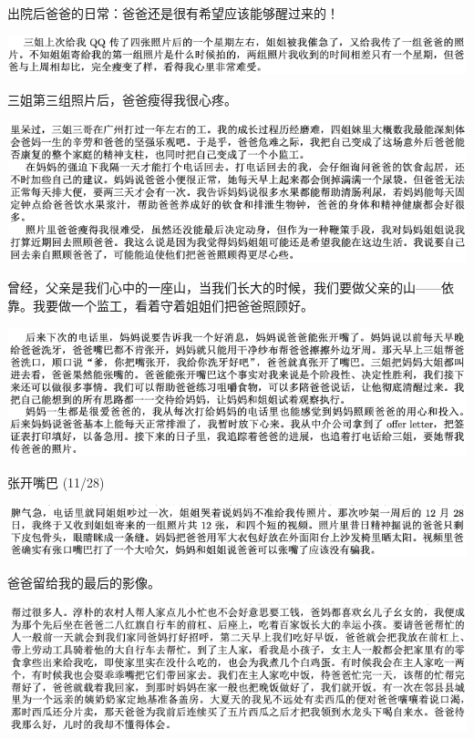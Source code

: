 \documentclass[9pt, b5paper]{article}
\begin{document}
出院后爸爸的日常：爸爸还是很有希望应该能够醒过来的！

\begin{center}
\includegraphics[width=.9\linewidth]{./pic/backups_plans_20210416_163119.png}
\end{center}

三姐第三组照片后，爸爸瘦得我很心疼。

\begin{center}
\includegraphics[width=.9\linewidth]{./pic/backups_plans_20210416_163250.png}
\end{center}

曾经，父亲是我们心中的一座山，当我们长大的时候，我们要做父亲的山——依靠。我要做一个监工，看着守着姐姐们把爸爸照顾好。

\begin{center}
\includegraphics[width=.9\linewidth]{./pic/backups_plans_20210416_163415.png}
\end{center}

张开嘴巴 (11/28)

\begin{center}
\includegraphics[width=.9\linewidth]{./pic/backups_plans_20210416_163715.png}
\end{center}

爸爸留给我的最后的影像。

\begin{center}
\includegraphics[width=.9\linewidth]{./pic/backups_plans_20210417_121853.png}
\end{center}
\end{document}
